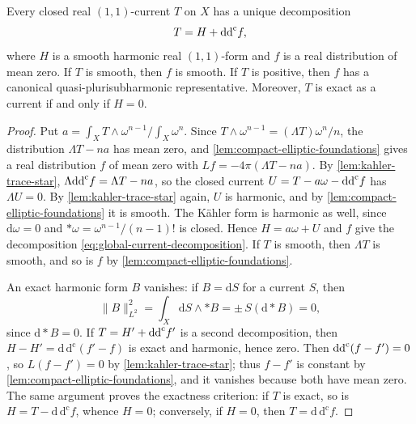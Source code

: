 \begin{theorem}\label{thm:global-ddc-lemma}
Every closed real $(1,1)$-current $T$ on $X$ has a unique decomposition
\begin{equation}\label{eq:global-current-decomposition}
 T=H+\mathrm{dd}^{\mathrm{c}} f,
\end{equation}
where $H$ is a smooth harmonic real $(1,1)$-form and $f$ is a real distribution of mean zero. If $T$ is smooth, then $f$ is smooth. If $T$ is positive, then $f$ has a canonical quasi-plurisubharmonic representative. Moreover, $T$ is exact as a current if and only if $H=0$.
\end{theorem}
\begin{proof}
Put $a=\int_XT\wedge\omega^{n-1}/\int_X\omega^n$. Since $T\wedge\omega^{n-1}=(\Lambda T)\omega^n/n$, the distribution $\Lambda T-na$ has mean zero, and \cref{lem:compact-elliptic-foundations} gives a real distribution $f$ of mean zero with $Lf=-4\pi(\Lambda T-na)$. By \cref{lem:kahler-trace-star}, $\Lambda\mathrm{dd}^{\mathrm{c}} f=\Lambda T-na$, so the closed current $U=T-a\omega-\mathrm{dd}^{\mathrm{c}} f$ has $\Lambda U=0$. By \cref{lem:kahler-trace-star} again, $U$ is harmonic, and by \cref{lem:compact-elliptic-foundations} it is smooth. The K\"ahler form is harmonic as well, since $\mathrm d\omega=0$ and $*\omega=\omega^{n-1}/(n-1)!$ is closed. Hence $H=a\omega+U$ and $f$ give the decomposition \eqref{eq:global-current-decomposition}. If $T$ is smooth, then $\Lambda T$ is smooth, and so is $f$ by \cref{lem:compact-elliptic-foundations}.

An exact harmonic form $B$ vanishes: if $B=\mathrm dS$ for a current $S$, then
\[
 \|B\|_{L^2}^2=\int_X\mathrm dS\wedge*B=\pm\, S(\mathrm d*B)=0,
\]
since $\mathrm d*B=0$. If $T=H'+\mathrm{dd}^{\mathrm{c}} f'$ is a second decomposition, then $H-H'=\mathrm d\,\mathrm d^{\mathrm c}(f'-f)$ is exact and harmonic, hence zero. Then $\mathrm{dd}^{\mathrm{c}}(f-f')=0$, so $L(f-f')=0$ by \cref{lem:kahler-trace-star}; thus $f-f'$ is constant by \cref{lem:compact-elliptic-foundations}, and it vanishes because both have mean zero. The same argument proves the exactness criterion: if $T$ is exact, so is $H=T-\mathrm d\,\mathrm d^{\mathrm c}f$, whence $H=0$; conversely, if $H=0$, then $T=\mathrm d\,\mathrm d^{\mathrm c}f$.


\end{proof}
